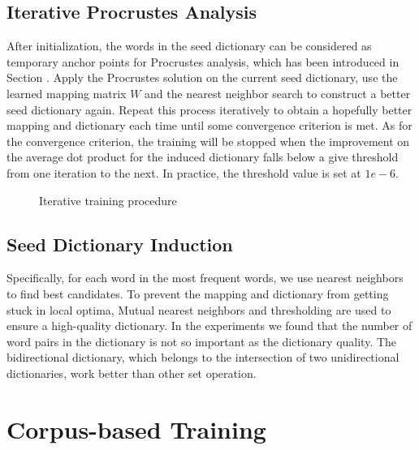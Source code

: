 \subsection{Iterative Procrustes Analysis}
After initialization, the words in the seed dictionary can be considered as temporary  anchor points for Procrustes analysis, which has been introduced in Section .
Apply the Procrustes solution on the current seed dictionary, use the learned mapping matrix $W$ and the nearest neighbor search to construct a better seed dictionary again. Repeat this process iteratively to obtain a hopefully better mapping and dictionary each time until some convergence  criterion is met. As for the convergence criterion, the training will be stopped when the improvement on the average dot product for the induced dictionary falls below a give threshold from one iteration to the next. In practice, the threshold value is set at $1e-6$.
\begin{figure}[h]
	\centering
	\begin{minipage}{.7\linewidth}
		\begin{algorithm}[H]
			\SetAlgoLined
			\caption{Iterative training procedure}
		\end{algorithm}
	\end{minipage}
\end{figure}
\subsection{Seed Dictionary Induction}
Specifically, for each word in the most frequent words, we use nearest neighbors to find best candidates. To prevent the mapping and dictionary from getting stuck in local optima, Mutual nearest neighbors and thresholding are used to ensure a high-quality dictionary. In the experiments we found that the number of word pairs in the dictionary is not so important as the dictionary quality. The bidirectional dictionary, which belongs to the intersection of two unidirectional dictionaries, work better than other set operation. 
\section{Corpus-based Training}
